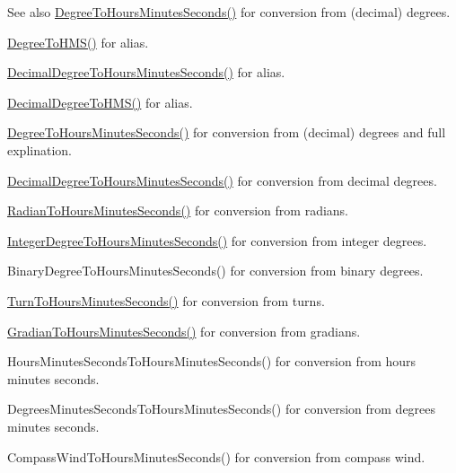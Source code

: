\begin{DoxySeeAlso}{See also}
\mbox{\hyperlink{group___e_g_x_math-_angle_conversions-_degree_ga770b13da33b6f6c7bfa398cca7f24dbe}{Degree\+To\+Hours\+Minutes\+Seconds()}} for conversion from (decimal) degrees. 

\mbox{\hyperlink{group___e_g_x_math-_angle_conversions-_degree_ga0bb223ca6e77b00439a6d910ab32d82e}{Degree\+To\+H\+M\+S()}} for alias. 

\mbox{\hyperlink{group___e_g_x_math-_angle_conversions-_decimal_degree_gaa3f0b6c7c497882935487ad2d55a0f5a}{Decimal\+Degree\+To\+Hours\+Minutes\+Seconds()}} for alias. 

\mbox{\hyperlink{group___e_g_x_math-_angle_conversions-_decimal_degree_ga981b48f16766590641360ca98dfa7b8c}{Decimal\+Degree\+To\+H\+M\+S()}} for alias. 

\mbox{\hyperlink{group___e_g_x_math-_angle_conversions-_degree_ga770b13da33b6f6c7bfa398cca7f24dbe}{Degree\+To\+Hours\+Minutes\+Seconds()}} for conversion from (decimal) degrees and full explination. 

\mbox{\hyperlink{group___e_g_x_math-_angle_conversions-_decimal_degree_gaa3f0b6c7c497882935487ad2d55a0f5a}{Decimal\+Degree\+To\+Hours\+Minutes\+Seconds()}} for conversion from decimal degrees. 

\mbox{\hyperlink{group___e_g_x_math-_angle_conversions-_radian_ga3467598d89af2b8ff68af50b39bb19e2}{Radian\+To\+Hours\+Minutes\+Seconds()}} for conversion from radians. 

\mbox{\hyperlink{group___e_g_x_math-_angle_conversions-_integer_degree_gaaac96728b305fd8ed024843f4e92fd08}{Integer\+Degree\+To\+Hours\+Minutes\+Seconds()}} for conversion from integer degrees. 

Binary\+Degree\+To\+Hours\+Minutes\+Seconds() for conversion from binary degrees. 

\mbox{\hyperlink{group___e_g_x_math-_angle_conversions-_turn_ga0bc017b3314253352ddec728d3f6b76a}{Turn\+To\+Hours\+Minutes\+Seconds()}} for conversion from turns. 

\mbox{\hyperlink{group___e_g_x_math-_angle_conversions-_gradian_gaf174cf5b716d5a490b3744ffe9ff3b97}{Gradian\+To\+Hours\+Minutes\+Seconds()}} for conversion from gradians. 

Hours\+Minutes\+Seconds\+To\+Hours\+Minutes\+Seconds() for conversion from hours minutes seconds. 

Degrees\+Minutes\+Seconds\+To\+Hours\+Minutes\+Seconds() for conversion from degrees minutes seconds. 

Compass\+Wind\+To\+Hours\+Minutes\+Seconds() for conversion from compass wind. 
\end{DoxySeeAlso}
\mbox{\label{group___e_g_x_math-_angle_conversions-_degree_gaabd20f21be3c18ee423d0bc1a677c6f6}} 
